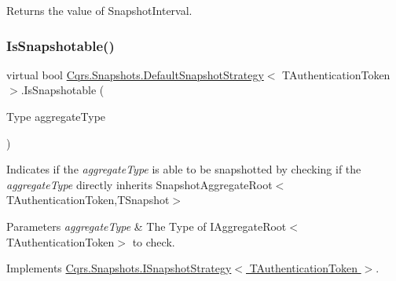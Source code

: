 Returns the value of Snapshot\+Interval. 

\mbox{\label{classCqrs_1_1Snapshots_1_1DefaultSnapshotStrategy_acdbb918ac01b526aedb5fa9a3879887a_acdbb918ac01b526aedb5fa9a3879887a}} 
\subsubsection{\texorpdfstring{Is\+Snapshotable()}{IsSnapshotable()}}
{\footnotesize\ttfamily virtual bool \hyperlink{classCqrs_1_1Snapshots_1_1DefaultSnapshotStrategy}{Cqrs.\+Snapshots.\+Default\+Snapshot\+Strategy}$<$ T\+Authentication\+Token $>$.Is\+Snapshotable (\begin{DoxyParamCaption}\item[{Type}]{aggregate\+Type }\end{DoxyParamCaption})\hspace{0.3cm}{\ttfamily [virtual]}}



Indicates if the {\itshape aggregate\+Type}  is able to be snapshotted by checking if the {\itshape aggregate\+Type}  directly inherits Snapshot\+Aggregate\+Root$<$\+T\+Authentication\+Token,\+T\+Snapshot$>$ 


\begin{DoxyParams}{Parameters}
{\em aggregate\+Type} & The Type of I\+Aggregate\+Root$<$\+T\+Authentication\+Token$>$ to check.\\
\hline
\end{DoxyParams}


Implements \hyperlink{interfaceCqrs_1_1Snapshots_1_1ISnapshotStrategy_a02121821312c4ce2811b31eeaffabe51_a02121821312c4ce2811b31eeaffabe51}{Cqrs.\+Snapshots.\+I\+Snapshot\+Strategy$<$ T\+Authentication\+Token $>$}.

\mbox{\label{classCqrs_1_1Snapshots_1_1DefaultSnapshotStrategy_a211413236ef217c73a69e8d7fe4e555e_a211413236ef217c73a69e8d7fe4e555e}} 
